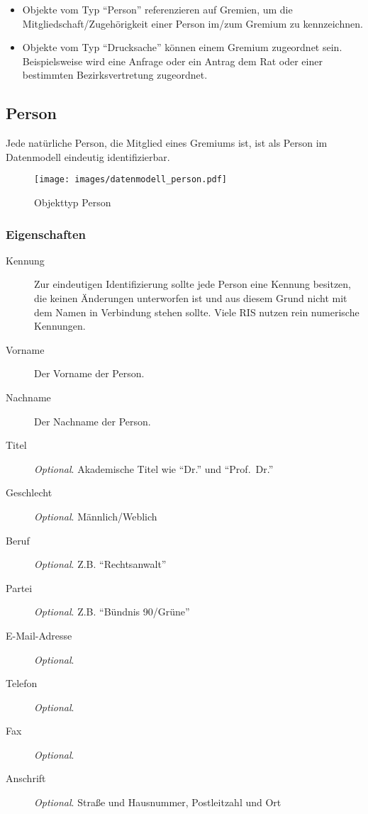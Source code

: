 \documentclass[,a4paper]{article}
\makeatletter
\def\maxwidth{\ifdim\Gin@nat@width>\linewidth\linewidth
\else\Gin@nat@width\fi}
\let\Oldincludegraphics\includegraphics
\renewcommand{\includegraphics}[1]{\Oldincludegraphics[width=\maxwidth]{#1}}
\makeatother
\begin{document}
\begin{itemize}
\item
  Objekte vom Typ ``Person'' referenzieren auf Gremien, um die
  Mitgliedschaft/Zugehörigkeit einer Person im/zum Gremium zu
  kennzeichnen.
\item
  Objekte vom Typ ``Drucksache'' können einem Gremium zugeordnet sein.
  Beispielsweise wird eine Anfrage oder ein Antrag dem Rat oder einer
  bestimmten Bezirksvertretung zugeordnet.
\end{itemize}

\subsection{Person}

Jede natürliche Person, die Mitglied eines Gremiums ist, ist als Person
im Datenmodell eindeutig identifizierbar.

\begin{figure}[htbp]
\centering
\texttt{[image: images/datenmodell\_person.pdf]}
\caption{Objekttyp Person}
\end{figure}

\subsubsection{Eigenschaften}

\begin{description}
\item[Kennung]
Zur eindeutigen Identifizierung sollte jede Person eine Kennung
besitzen, die keinen Änderungen unterworfen ist und aus diesem Grund
nicht mit dem Namen in Verbindung stehen sollte. Viele RIS nutzen rein
numerische Kennungen.
\item[Vorname]
Der Vorname der Person.
\item[Nachname]
Der Nachname der Person.
\item[Titel]
\emph{Optional}. Akademische Titel wie ``Dr.'' und ``Prof.~Dr.''
\item[Geschlecht]
\emph{Optional}. Männlich/Weblich
\item[Beruf]
\emph{Optional}. Z.B. ``Rechtsanwalt''
\item[Partei]
\emph{Optional}. Z.B. ``Bündnis 90/Grüne''
\item[E-Mail-Adresse]
\emph{Optional}.
\item[Telefon]
\emph{Optional}.
\item[Fax]
\emph{Optional}.
\item[Anschrift]
\emph{Optional}. Straße und Hausnummer, Postleitzahl und Ort
\end{description}
\end{document}
